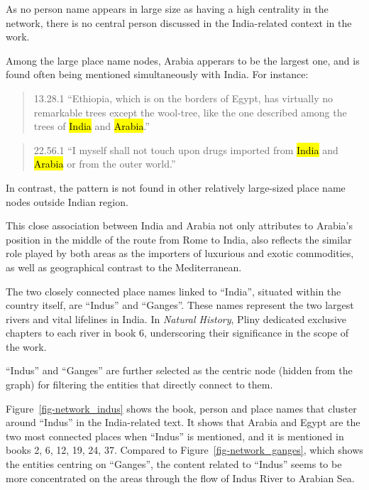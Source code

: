 \documentclass[
  12pt,
]{article}
\begin{document}
As no person name appears in large size as having a high centrality in
the network, there is no central person discussed in the India-related
context in the work.

Among the large place name nodes, Arabia apperars to be the largest one,
and is found often being mentioned simultaneously with India. For
instance:

\begin{quote}
13.28.1 ``Ethiopia, which is on the borders of Egypt, has virtually no
remarkable trees except the wool-tree, like the one described among the
trees of \hl{India} and \hl{Arabia}.''
\end{quote}

\begin{quote}
22.56.1 ``I myself shall not touch upon drugs imported from \hl{India}
and \hl{Arabia} or from the outer world.''
\end{quote}

In contrast, the pattern is not found in other relatively large-sized
place name nodes outside Indian region.

This close association between India and Arabia not only attributes to
Arabia's position in the middle of the route from Rome to India, also
reflects the similar role played by both areas as the importers of
luxurious and exotic commodities, as well as geographical contrast to
the Mediterranean.

The two closely connected place names linked to ``India'', situated
within the country itself, are ``Indus'' and ``Ganges''. These names
represent the two largest rivers and vital lifelines in India. In
\emph{Natural History}, Pliny dedicated exclusive chapters to each river
in book 6, underscoring their significance in the scope of the work.

``Indus'' and ``Ganges'' are further selected as the centric node
(hidden from the graph) for filtering the entities that directly connect
to them.

Figure~\ref{fig-network_indus} shows the book, person and place names
that cluster around ``Indus'' in the India-related text. It shows that
Arabia and Egypt are the two most connected places when ``Indus'' is
mentioned, and it is mentioned in books 2, 6, 12, 19, 24, 37. Compared
to Figure~\ref{fig-network_ganges}, which shows the entities centring on
``Ganges'', the content related to ``Indus'' seems to be more
concentrated on the areas through the flow of Indus River to Arabian
Sea.
\end{document}
